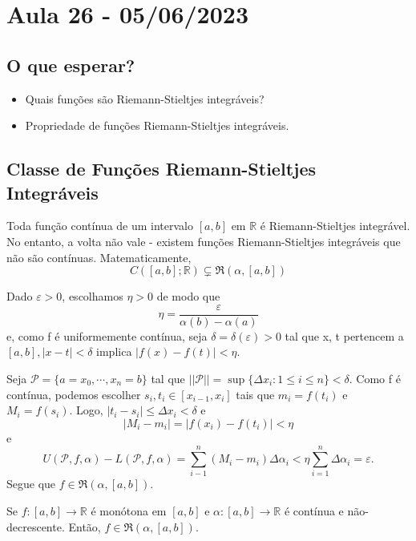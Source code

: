 \documentclass[Analysis/analysis_notes.tex]{subfiles}
\begin{document}
\section{Aula 26 - 05/06/2023}
\subsection{O que esperar?}
\begin{itemize}
	\item Quais fun\c cões são Riemann-Stieltjes integráveis?
	\item Propriedade de fun\c cões Riemann-Stieltjes integráveis.
\end{itemize}
\subsection{Classe de Fun\c cões Riemann-Stieltjes Integráveis}
\begin{theorem*}
	Toda fun\c cão contínua de um intervalo \([a, b]\) em \(\mathbb{R}\) é Riemann-Stieltjes
	integrável. No entanto, a volta não vale - existem fun\c cões Riemann-Stieltjes integráveis que
	não são contínuas. Matematicamente,
	\[
		C([a, b]; \mathbb{R})\subsetneq{\mathfrak{R}(\alpha , [a,b])}
	\]
\end{theorem*}
\begin{proof*}
	Dado \(\varepsilon >0\), escolhamos \(\eta >0\) de modo que
	\[
		\eta = \frac{\varepsilon }{\alpha (b) - \alpha (a)}
	\]
	e, como f é uniformemente contínua, seja \(\delta =\delta (\varepsilon ) > 0\) tal que
	x, t pertencem a \([a, b], |x-t| < \delta \) implica \(|f(x)-f(t)| < \eta \).

	Seja \(\mathcal{P} = \{a=x_{0}, \cdots, x_{n} =b \}\) tal que \(||\mathcal{P}||=\sup\{\Delta x_{i}: 1\leq i\leq n\} < \delta.\)
	Como f é contínua, podemos escolher \(s_{i},t_{i}\in[x_{i-1}, x_{i}]\) tais que
	\(m_{i}=f(t_{i})\) e \(M_{i}=f(s_{i})\). Logo, \(|t_{i}-s_{i}|\leq \Delta x_{i} < \delta \) e
	\[
		|M_{i}-m_{i}| = |f(x_{i}) - f(t_{i})| < \eta
	\]
	e
	\[
		U(\mathcal{P}, f, \alpha ) - L(\mathcal{P}, f, \alpha ) = \sum\limits_{i-1}^{n}(M_{i}-m_{i})\Delta \alpha_{i} < \eta \sum\limits_{i=1}^{n}\Delta \alpha_{i} = \varepsilon .
	\]
	Segue que \(f\in \mathfrak{R}(\alpha , [a, b]).\) \qedsymbol
\end{proof*}
\begin{theorem*}
	Se \(f:[a, b]\rightarrow \mathbb{R}\) é monótona em \([a, b]\) e \(\alpha :[a, b]\rightarrow \mathbb{R}\) é
	contínua e não-decrescente. Então, \(f\in \mathfrak{R}(\alpha, [a,b]).\)
\end{theorem*}
\end{document}
